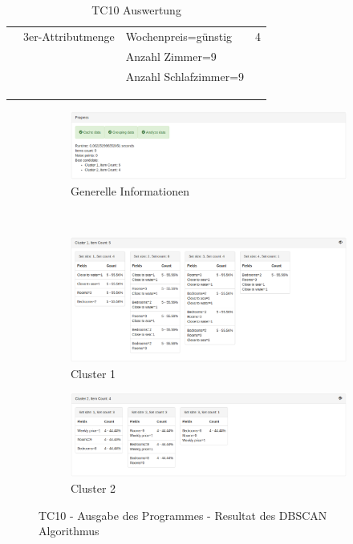 \begin{longtable}{ | l | l | l | l |}
	& 3er-Attributmenge & \tabitem Wochenpreis=günstig & 4 \\
	& & \tabitem Anzahl Zimmer=9 & \\ 
	& & \tabitem Anzahl Schlafzimmer=9 & \\ \hline
	
	\rowcolor{tableheadcolor}
	\multicolumn{4}{|l|}{\bfseries Testergebnis} \\ \hline 
	\multicolumn{4}{|l|}{\cellcolor{green!25}} \\ \hline 
	
	\caption{TC10 Auswertung}
	\centering
	\label{fig:testingfazit:testing:testcases:10}
\end{longtable}
\begin{figure}[H]
	\begin{subfigure}[t]{1\textwidth}
		\centering
		\includegraphics[width=1\textwidth]{images/tc10-dbscan-1}
		\caption{Generelle Informationen}
		\label{fig:testingfazit:testing:testcases:10-1-1}
	\end{subfigure} \\
	\begin{subfigure}[t]{1\textwidth}
		\centering
		\includegraphics[width=1\textwidth]{images/tc10-dbscan-2}
		\caption{Cluster 1}
		\label{fig:testingfazit:testing:testcases:10-1-2}
	\end{subfigure}
	\begin{subfigure}[t]{1\textwidth}
		\centering
		\includegraphics[width=1\textwidth]{images/tc10-dbscan-3}
		\caption{Cluster 2}
		\label{fig:testingfazit:testing:testcases:10-1-3}
	\end{subfigure}
	\caption{TC10 - Ausgabe des Programmes - Resultat des DBSCAN Algorithmus}
	\label{fig:testingfazit:testing:testcases:10-1}
\end{figure}
